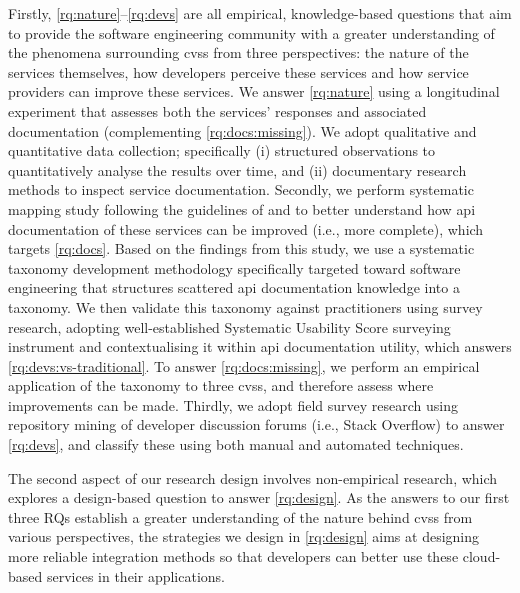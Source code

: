 Firstly, \ref{rq:nature}--\ref{rq:devs} are all empirical, knowledge-based questions \citep{Easterbrook:2007ws,Meltzoff:1998wg} that aim to provide the software engineering community with a greater understanding of the phenomena surrounding \glspl{cvs} from three perspectives: the nature of the services themselves, how developers perceive these services and how service providers can improve these services.  We answer \ref{rq:nature} using a longitudinal experiment that assesses both the services' responses and associated documentation (complementing \ref{rq:docs:missing}). We adopt qualitative and quantitative data collection; specifically (i) structured observations to quantitatively analyse the results over time, and (ii) documentary research methods to inspect service documentation.
Secondly, we perform systematic mapping study following the guidelines of \citet{Kitchenham:2007dd} and \citet{Petersen:2008td} to better understand how \gls{api} documentation of these services can be improved (i.e., more complete), which targets \ref{rq:docs}. Based on the findings from this study, we use a systematic taxonomy development methodology specifically targeted toward software engineering \citep{Usman:2017hn} that structures scattered \gls{api} documentation knowledge into a taxonomy. We then validate this taxonomy against practitioners using survey research, adopting \citeauthor{Brooke:1996ua} well-established Systematic Usability Score \citep{Brooke:1996ua} surveying instrument and contextualising it within \gls{api} documentation utility, which answers \ref{rq:devs:vs-traditional}. To answer \ref{rq:docs:missing}, we perform an empirical application of the taxonomy to three \glspl{cvs}, and therefore assess where improvements can be made.
Thirdly, we adopt field survey research using repository mining of developer discussion forums (i.e., Stack Overflow) to answer \ref{rq:devs}, and classify these using both manual and automated techniques.

The second aspect of our research design involves non-empirical research, which explores a design-based question \citep{Simon:1996uw} to answer \ref{rq:design}. As the answers to our first three RQs establish a greater understanding of the nature behind \glspl{cvs} from various perspectives, the strategies we design in \ref{rq:design} aims at designing more reliable integration methods so that developers can better use these cloud-based services in their applications.